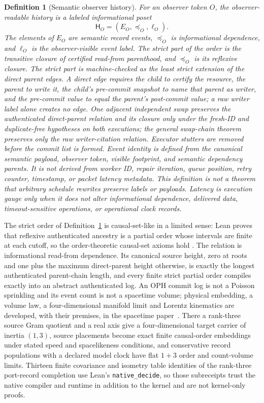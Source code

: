 \documentclass[11pt]{article}
\newtheorem{definition}[theorem]{Definition}
\begin{document}
\begin{definition}[Semantic observer history]\label{def:semantic-observer-history}
For an observer token \(O\), the observer-readable history is a labeled informational poset
\[
\mathsf H_O=(E_O,\preceq_O,\ell_O).
\]
The elements of \(E_O\) are semantic record events, \(\preceq_O\) is informational
dependence, and \(\ell_O\) is the observer-visible event label. The strict part
of the order is the transitive closure of certified read-from parenthood, and
\(\preceq_O\) is its reflexive closure. The strict part is machine-checked as
the least strict extension of the direct parent edges. A direct edge requires
the child to certify the resource, the parent to write it, the child's
pre-commit snapshot to name that parent as writer, and the pre-commit value to
equal the parent's post-commit value; a raw writer label alone creates no
edge. One adjacent independent swap preserves the authenticated direct-parent
relation and its closure only under the fresh-ID and duplicate-free hypotheses
on both executions; the general swap-chain theorem preserves only the raw
writer-citation relation. Executor stutters are removed before the commit list
is formed. Event identity is defined from the
canonical semantic payload, observer token, visible footprint, and semantic dependency parents. It is
not derived from worker ID, repair iteration, queue position, retry counter, timestamp, or packet
latency metadata. This definition is not a theorem that arbitrary schedule
rewrites preserve labels or payloads. Latency is execution gauge only when it does not alter informational dependence,
delivered data, timeout-sensitive operations, or operational clock records.
\end{definition}

The strict order of Definition~\ref{def:semantic-observer-history} is
causal-set-like in a limited sense: Lean proves that reflexive authenticated
ancestry is a partial order whose intervals are finite at each cutoff, so the
order-theoretic causal-set axioms hold \cite{bombelli1987,surya2019}. The
relation is informational read-from dependence. Its canonical source height,
zero at roots and one plus the maximum direct-parent height otherwise, is
exactly the longest authenticated parent-chain length, and every finite
strict partial order compiles exactly into an abstract authenticated log. An
OPH commit log is not a Poisson sprinkling and its event count is not a
spacetime volume; physical embedding, a volume law, a four-dimensional
manifold limit and Lorentz kinematics are developed, with their premises, in
the spacetime paper~\cite{ophEinstein}. There a rank-three source Gram
quotient and a real axis give a four-dimensional target carrier of inertia
\((1,3)\), source placements become exact finite causal-order embeddings under
stated speed and spacelikeness conditions, and conservative record populations
with a declared model clock have flat \(1+3\) order and count-volume limits. Thirteen finite covariance and isometry table identities of the
rank-three port-record completion use Lean's \texttt{native\_decide}, so those
subreceipts trust the native compiler and runtime in addition to the kernel
and are not kernel-only proofs.
\end{document}

